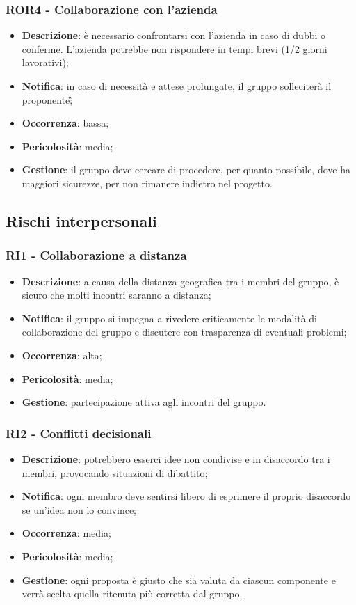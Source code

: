 	\subsubsection*{ROR4 - Collaborazione con l'azienda}
	\begin{itemize}
		\item \textbf{Descrizione}: è necessario confrontarsi con l'azienda in caso di dubbi o conferme. L'azienda potrebbe non rispondere in tempi brevi (1/2 giorni lavorativi);
		\item \textbf{Notifica}: in caso di necessità e attese prolungate, il gruppo solleciterà il proponente\G;
		\item \textbf{Occorrenza}: bassa;
		\item \textbf{Pericolosità}: media;
		\item \textbf{Gestione}: il gruppo deve cercare di procedere, per quanto possibile, dove ha maggiori sicurezze, per non rimanere indietro nel progetto.
	\end{itemize}

   \subsection{Rischi interpersonali}

	\subsubsection*{RI1 - Collaborazione a distanza}
	\begin{itemize}
		\item \textbf{Descrizione}: a causa della distanza geografica tra i membri del gruppo, è sicuro che molti incontri saranno a distanza;
		\item \textbf{Notifica}: il gruppo si impegna a rivedere criticamente le modalità di collaborazione del gruppo e discutere con trasparenza di eventuali problemi;
		\item \textbf{Occorrenza}: alta;
		\item \textbf{Pericolosità}: media;
		\item \textbf{Gestione}: partecipazione attiva agli incontri del gruppo.
	\end{itemize}

	\subsubsection*{RI2 - Conflitti decisionali}
	\begin{itemize}
		\item \textbf{Descrizione}: potrebbero esserci idee non condivise e in disaccordo tra i membri, provocando situazioni di dibattito;
		\item \textbf{Notifica}: ogni membro deve sentirsi libero di esprimere il proprio disaccordo se un'idea non lo convince;
		\item \textbf{Occorrenza}: media;
		\item \textbf{Pericolosità}: media;
		\item \textbf{Gestione}: ogni proposta è giusto che sia valuta da ciascun componente e verrà scelta quella ritenuta più corretta dal gruppo.
	\end{itemize}

